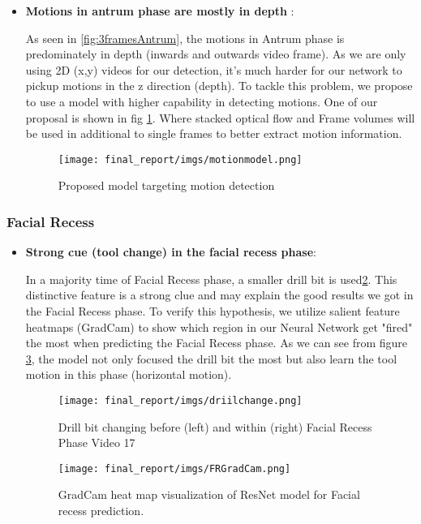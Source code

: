 \documentclass[11pt]{article} \usepackage[top=1in, bottom=1in, left=1in, right=1in]{geometry}
\begin{document}
\begin{itemize}
    \item \textbf{Motions in antrum phase are mostly in depth }:
    
    As seen in \ref{fig:3framesAntrum}, the motions in Antrum phase is predominately in depth (inwards and outwards video frame). As we are only using 2D (x,y) videos for our detection, it's much harder for our network to pickup motions in the z direction (depth). To tackle this problem, we propose to use a model with higher capability in detecting motions.
    One of our proposal is shown in fig \ref{fig:motionmodel}. Where stacked optical flow and Frame volumes will be used in additional to single frames to better extract motion information.
    \begin{figure}[H]
      \texttt{[image: final\_report/imgs/motionmodel.png]}
      \centering
      \caption{Proposed model targeting motion detection}
      \label{fig:motionmodel}
    \end{figure}
\end{itemize}

\subsubsection{Facial Recess}
\begin{itemize}
    \item \textbf{Strong cue (tool change) in the facial recess phase}:
    
    In a majority time of Facial Recess phase, a smaller drill bit is used\ref{fig:drill}. This distinctive feature is a strong clue and may explain the good results we got in the Facial Recess phase. To verify this hypothesis, we utilize salient feature heatmaps (GradCam) to show which region in our Neural Network get "fired" the most when predicting the Facial Recess phase. As we can see from figure \ref{fig:FRGradcam}, the model not only focused the drill bit the most but also learn the tool motion in this phase (horizontal motion).
    \begin{figure}[H]
      \texttt{[image: final\_report/imgs/driilchange.png]}
      \centering
      \caption{Drill bit changing before (left) and within (right) Facial Recess Phase Video 17}
      \label{fig:drill}
    \end{figure}
    \begin{figure}[H]
      \texttt{[image: final\_report/imgs/FRGradCam.png]}
      \centering
      \caption{GradCam heat map visualization of ResNet model for Facial recess prediction.}
     \label{fig:FRGradcam}
    \end{figure}
    
\end{itemize}
\end{document}
